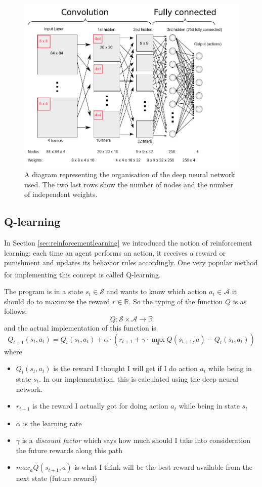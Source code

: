 \documentclass[a4paper,12pt]{article}
\begin{document}
\begin{figure}[H]
	\centering
	\includegraphics[width=\textwidth]{images/Convolutional_NN2.png}
	\caption{A diagram representing the organisation of the deep neural network used. The two last rows show the number of nodes and the number of independent weights.}
	\label{fig:neuralnet}
\end{figure}

\subsection{Q-learning}
In Section \ref{sec:reinforcementlearning} we introduced the notion of reinforcement learning: each time an agent performs an action, it receives a reward or punishment and updates its behavior rules accordingly. One very popular method for implementing this concept is called Q-learning\textsuperscript{\cite{watkins1992q}}.

The program is in a state $s_t \in \mathcal{S}$ and wants to know which action $a_t \in \mathcal{A}$ it should do to maximize the reward $r \in \mathds{R}$. So the typing of the function $Q$ is as follows:
$$Q: \mathcal{S} \times \mathcal{A} \rightarrow  \mathds{R}$$
and the actual implementation of this function is
$$Q_{t+1}(s_t, a_t) = Q_t(s_t, a_t) + \alpha\cdot(r_{t+1} + \gamma\cdot\max_{a}Q(s_{t+1}, a) - Q_t(s_t, a_t))$$
where
\begin{itemize}
	\itemsep 0em
	\item[] $Q_t(s_t, a_t)$ is the reward I thought I will get if I do action $a_t$ while being in state $s_t$. In our implementation, this is calculated using the deep neural network.
	\item[] $r_{t+1}$ is the reward I actually got for doing action $a_t$ while being in state $s_t$
	\item[] $\alpha$ is the learning rate
	\item[] $\gamma$ is a \emph{discount factor} which says how much should I take into consideration the future rewards along this path
	\item[] $max_{a}Q(s_{t+1}, a)$ is what I think will be the best reward available from the next state (future reward)
\end{itemize}
\end{document}
